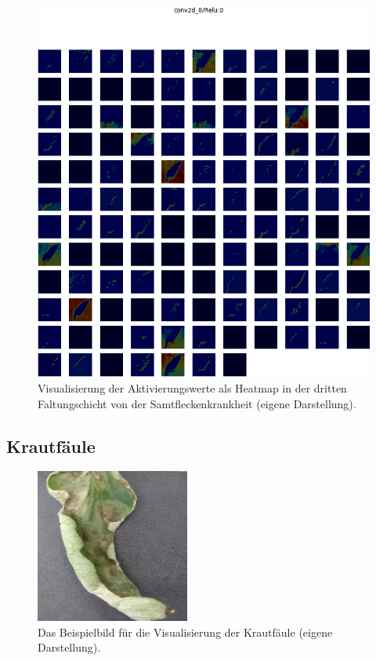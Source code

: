\begin{figure}[h!]
	\centering
	\includegraphics[width=\textwidth]{visualisierungen/leaf_mold/heatmap_mit/conv2d_8.png}
	\caption{Visualisierung der Aktivierungswerte als Heatmap in der dritten Faltungschicht von der Samtfleckenkrankheit (eigene Darstellung).}
	\label{mold6_heat_vis}
\end{figure}



\newpage
\subsection{Krautfäule}

\begin{figure}
	\centering
	\includegraphics[width=0.45\textwidth]{visualisierungen/late/late_sample.jpg}%
	\caption{Das Beispielbild für die Visualisierung der Krautfäule (eigene Darstellung).}
	\label{late_sample}
\end{figure}



